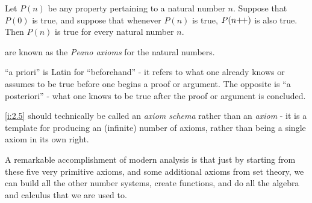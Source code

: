 \begin{ax}\label{i:2.5}
  Let \(P(n)\) be any property pertaining to a natural number \(n\).
  Suppose that \(P(0)\) is true, and suppose that whenever \(P(n)\) is true, \(P(n{+}\!{+})\) is also true.
  Then \(P(n)\) is true for every natural number \(n\).
\end{ax}

\begin{note}
   are known as the \emph{Peano axioms} for the natural numbers.
\end{note}

\begin{note}
  ``a priori'' is Latin for ``beforehand''
  - it refers to what one already knows or assumes to be true before one begins a proof or argument.
  The opposite is ``a posteriori''
  - what one knows to be true after the proof or argument is concluded.
\end{note}

\begin{note}
  \cref{i:2.5} should technically be called an \emph{axiom schema} rather than an \emph{axiom}
  - it is a template for producing an (infinite) number of axioms, rather than being a single axiom in its own right.
\end{note}

\begin{note}
  A remarkable accomplishment of modern analysis is that just by starting from these five very primitive axioms, and some additional axioms from set theory, we can build all the other number systems, create functions, and do all the algebra and calculus that we are used to.
\end{note}
